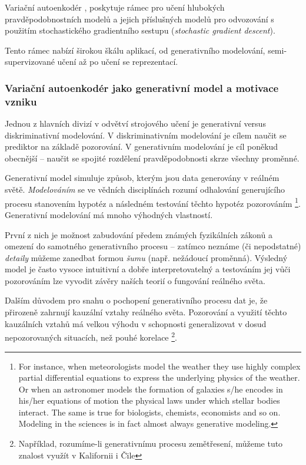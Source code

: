 Variační autoenkodér \cite{Kingma2014}, \cite{Rezende2014}
poskytuje rámec pro učení hlubokých pravděpodobnostních modelů
a jejich příslušných modelů pro odvozování s použitím stochastického gradientního sestupu (\emph{stochastic gradient descent}).

Tento rámec nabízí širokou škálu aplikací, od generativního modelování, semi-supervizované učení až po učení se reprezentací.

\subsubsection{Variační autoenkodér jako generativní model a motivace vzniku}
Jednou z hlavních divizí v odvětví strojového učení je generativní versus diskriminativní modelování.
V diskriminativním modelování je cílem naučit se prediktor na základě pozorování.
V generativním modelování je cíl poněkud obecnější – naučit se spojité rozdělení pravděpodobnosti skrze všechny proměnné.

Generativní model simuluje způsob, kterým jsou data generovány v reálném světě.
\emph{Modelováním} se ve vědních disciplínách rozumí odhalování generujícího procesu stanovením hypotéz a následném testování těchto hypotéz pozorováním
\footnote{For instance, when meteorologists
model the weather they use highly complex partial differential equations
to express the underlying physics of the weather. Or when an astronomer
models the formation of galaxies s/he encodes in his/her equations of
motion the physical laws under which stellar bodies interact. The same
is true for biologists, chemists, economists and so on. Modeling in the
sciences is in fact almost always generative modeling.}. 
Generativní modelování má mnoho výhodných vlastností.

První z nich je možnost zabudování předem známých fyzikálních zákonů a omezení do samotného generativního procesu – 
zatímco neznáme (či nepodstatné) \emph{detaily} můžeme zanedbat formou \emph{šumu} (např. nežádoucí proměnná).
Výsledný model je často vysoce intuitivní a dobře interpretovatelný a testováním jej vůči pozorováním lze vyvodit závěry naších teorií o fungování reálného světa.

Dalším důvodem pro snahu o pochopení generativního procesu dat je, že přirozeně zahrnují kauzální vztahy reálného světa.
Pozorování a využití těchto kauzálních vztahů má velkou výhodu v schopnosti generalizovat v dosud nepozorovaných situacích, než pouhé korelace 
\footnote{Například, rozumíme-li generativnímu procesu zemětřesení, můžeme tuto znalost využít v Kalifornii i Čile}.

